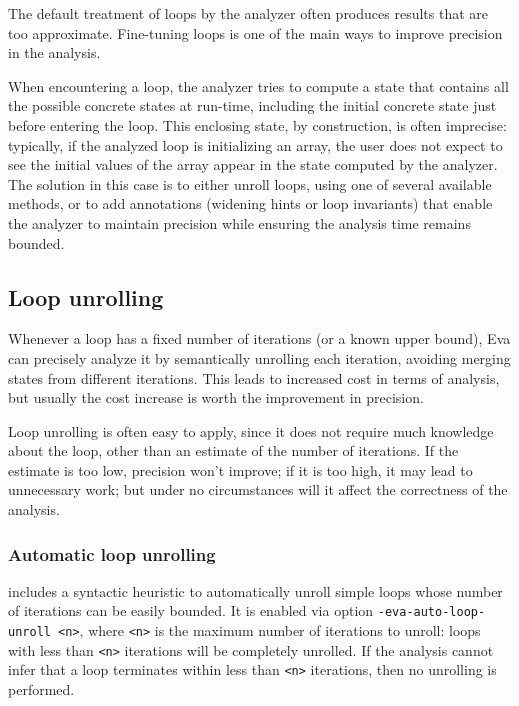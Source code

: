 \documentclass{frama-c-book}
\begin{document}
The default treatment of loops by the analyzer often produces
results that are too approximate.
Fine-tuning loops is one of the main ways to improve precision in the analysis.

When encountering a loop, the analyzer tries to compute a state
that contains all the possible concrete states at run-time,
including the initial concrete state just before entering the loop.
This enclosing state, by construction, is often imprecise:
typically, if the analyzed loop is initializing an array,
the user does not expect to see the initial values of
the array appear in the state computed by the analyzer.
The solution in this case is to either unroll loops, using one of several
available methods, or to add annotations (widening hints or loop invariants)
that enable the analyzer to maintain precision while ensuring the analysis
time remains bounded.

\subsection{Loop unrolling}
\label{loop-unroll}

Whenever a loop has a fixed number of iterations (or a known upper bound),
Eva can precisely analyze it by semantically unrolling each iteration,
avoiding merging states from different iterations.
This leads to increased cost in terms of analysis, but usually the cost
increase is worth the improvement in precision.

Loop unrolling is often easy to apply, since it does not require much
knowledge about the loop, other than an estimate of the number of iterations.
If the estimate is too low, precision won't improve; if it is too high,
it may lead to unnecessary work; but under no circumstances will it affect the
correctness of the analysis.

\subsubsection{Automatic loop unrolling}

\Eva{} includes a syntactic heuristic to automatically unroll simple loops
whose number of iterations can be easily bounded.
It is enabled via option \lstinline|-eva-auto-loop-unroll <n>|, where
\lstinline|<n>| is the maximum number of iterations to unroll: loops with
less than \lstinline|<n>| iterations will be completely unrolled.
If the analysis cannot infer that a loop terminates within less than
\lstinline|<n>| iterations, then no unrolling is performed.
\end{document}
